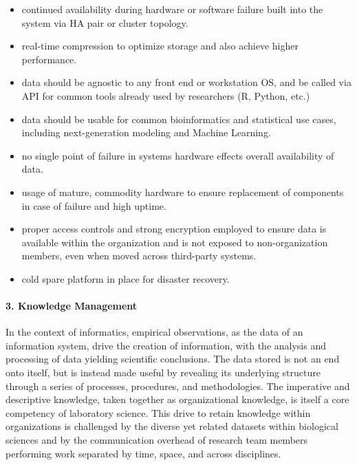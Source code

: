 \documentclass[12pt, letterpaper,oneocolumn]{article}
\begin{document}
\begin{itemize}
\item
  continued availability during hardware or software failure built into
  the system via HA pair or cluster topology.
\item
  real-time compression to optimize storage and also achieve higher
  performance.
\item
  data should be agnostic to any front end or workstation OS, and be
  called via API for common tools already used by researchers (R,
  Python, etc.)
\item
  data should be usable for common bioinformatics and statistical use
  cases, including next-generation modeling and Machine Learning.
\item
  no single point of failure in systems hardware effects overall
  availability of data.
\item
  usage of mature, commodity hardware to ensure replacement of
  components in case of failure and high uptime.
\item
  proper access controls and strong encryption employed to ensure data
  is available within the organization and is not exposed to
  non-organization members, even when moved across third-party systems.
\item
  cold spare platform in place for disaster recovery.
\end{itemize}

\paragraph{3. Knowledge Management}
In the context of informatics, empirical observations, as the data of an information system, drive the creation of information, with the analysis and processing of data yielding scientific conclusions. The data stored is not an end onto itself, but is instead made useful by revealing its underlying structure through a series of processes, procedures, and methodologies. The imperative and descriptive knowledge, taken together as organizational knowledge, is itself a core competency of laboratory science. This drive to retain knowledge within organizations is challenged by the diverse yet related datasets within biological sciences and by the communication overhead of research team members performing work separated by time, space, and across disciplines. \cite{knowledge_management}
\end{document}
